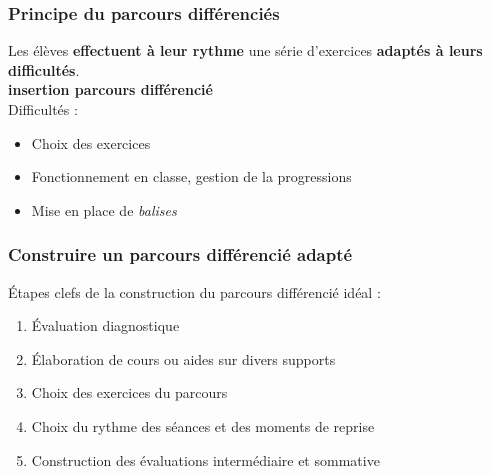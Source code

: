 \begin{frame}
    \frametitle{Principe du parcours différenciés}
	Les élèves \textbf{effectuent à leur rythme} une série d'exercices \textbf{adaptés à leurs difficultés}.\\
	\vspace*{1.5cm}
	\textbf{insertion parcours différencié}\\
	Difficultés :
	\begin{itemize}
		\item Choix des exercices
		\item Fonctionnement en classe, gestion de la progressions
		\item Mise en place de \textit{balises}
	\end{itemize}
\end{frame}

\begin{frame}
	\frametitle{Construire un parcours différencié adapté}
	\vspace*{0.5cm}
	\'{E}tapes clefs de la construction du parcours différencié idéal :\\
	\begin{enumerate}
		\item \'{E}valuation diagnostique
		\item \'{E}laboration de cours ou aides sur divers supports
		\item Choix des exercices du parcours
		\item Choix du rythme des séances et des moments de reprise
		\item Construction des évaluations intermédiaire et sommative
	\end{enumerate}
\end{frame}
